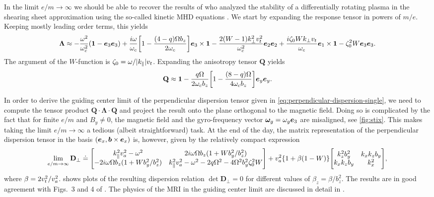\documentclass[aps,pre,notitlepage,amsmath,amssymb,amsfonts,nobibnotes,nofootinbib,superscriptaddress]{revtex4-1}
\begin{document}
In the limit $e/m\to\infty$ we should be able to recover the results of
\citet{Quataert2002} who analyzed the stability of a differentially rotating
plasma in the shearing sheet approximation using the so-called kinetic MHD
equations \citep{Grad1961,Kulsrud1983,Hazeltine2004}. We start by expanding
the response tensor in powers of $m/e$. Keeping mostly leading order terms,
this yields
\begin{equation}
  \mathbf{\Lambda} \approx
  -\frac{\omega^2}{\omc^2}(\mathbf{1} - \vec{e}_3\vec{e}_3)
  + \frac{i\omega}{\omc}\left[1 - \frac{(4-q)\Omega b_z}{2\omc}\right]
  \vec{e}_3\times\mathbf{1}
  - \frac{2(W-1)k_\perp^2\vt^2}{\omc^2}\vec{e}_2\vec{e}_2
  + \frac{i\zeta_0 Wk_\perp\vt}{\omc}\vec{e}_1\times\mathbf{1}
  - \zeta_0^2 W\vec{e}_3\vec{e}_3.
\end{equation}
The argument of the $W$-function is $\zeta_0=\omega/|k_\parallel|v_t$.
Expanding the anisotropy tensor $\mathbf{Q}$ yields
\begin{equation}
  \mathbf{Q} \approx \mathbf{1} - \frac{q\Omega}{2\omc b_z}
  \left[1 - \frac{(8-q)\Omega}{4\omc b_z}\right]\ey\ey.
\end{equation}

In order to derive the guiding center limit of the perpendicular dispersion
tensor given in \cref{eq:perpendicular-dispersion-single}, we need to compute
the tensor product $\mathbf{Q}\cdot\mathbf{\Lambda}\cdot\mathbf{Q}$ and
project the result onto the plane orthogonal to the magnetic field. Doing so
is complicated by the fact that for finite $e/m$ and $B_y\ne{}0$, the magnetic
field and the gyro-frequency vector $\bm{\omega}_g=\omega_g\bm{e}_3$ are misaligned, see
\cref{fig:stix}. This makes taking the limit $e/m\to\infty$ a tedious (albeit
straightforward) task. At the end of the day, the matrix representation of the
perpendicular dispersion tensor 
in the basis $(\bm{e}_x,\bm{b}\times\bm{e}_x)$ is, however, given by the relatively
compact expression
\begingroup
\renewcommand*{\arraystretch}{1.4}
\begin{equation}
  \label{eq:DRguiding}
  \lim_{e/m\to\infty}\mathbf{D}_\perp \doteq
  \Bigg[\begin{matrix}
    k_\parallel^2\va^2 - \omega^2
    & 2i\omega\Omega b_z (1 + Wb_y^2/b_z^2) \\
    - 2i\omega\Omega b_z (1 + Wb_y^2/b_z^2)
    & k_\parallel^2\va^2 - \omega^2 - 2q\Omega^2 - 4\Omega^2b_y^2\zeta_0^2W
  \end{matrix}\Bigg]
  + \va^2\{1 + \beta(1-W)\}
  \Bigg[\begin{matrix}
    k_z^2 b_y^2 & k_x k_z b_y \\
    k_x k_z b_y & k_x^2
  \end{matrix}\Bigg],
\end{equation}
\endgroup
where $\beta=2v_t^2/v_a^2$.  shows plots of the
resulting dispersion relation $\det\mathbf{D}_\perp=0$ for different values of
$\beta_z=\beta/b_z^2$. The results are in good agreement with Figs.~3 and 4 of
\citet{Quataert2002}. The physics of the MRI in the guiding center limit are
discussed in detail in \citet{Quataert2002} \citep[see also][]{Balbus2004}.
\end{document}
